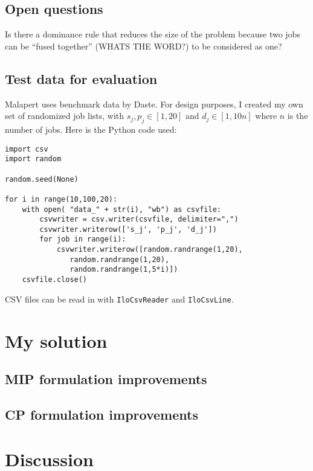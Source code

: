 \documentclass[13pt, letterpaper, twoside]{book}
\begin{document}
\section{Open questions}
\begin{alist}
\item{Is there a dominance rule that reduces the size of the problem because two
jobs can be ``fused together'' (WHATS THE WORD?) to be considered as one?}
\end{alist}

\section{Test data for evaluation}
Malapert uses benchmark data by Daste. For design purposes, I created my own set of randomized job lists, with $s_j, p_j \in [1, 20]$ and $d_j \in [1, 10n]$ where $n$ is the number of jobs. Here is the Python code used:

\lstset{language=Python}
\begin{lstlisting}
import csv
import random

random.seed(None)

for i in range(10,100,20):
    with open( "data_" + str(i), "wb") as csvfile:
        csvwriter = csv.writer(csvfile, delimiter=",")
        csvwriter.writerow(['s_j', 'p_j', 'd_j'])
        for job in range(i):
            csvwriter.writerow([random.randrange(1,20),
               random.randrange(1,20),
               random.randrange(1,5*i)])
    csvfile.close()
\end{lstlisting}

CSV files can be read in with \texttt{IloCsvReader} and \texttt{IloCsvLine}.


\chapter{My solution}
\section{MIP formulation improvements}
\section{CP formulation improvements}

\chapter{Discussion}
\end{document}

